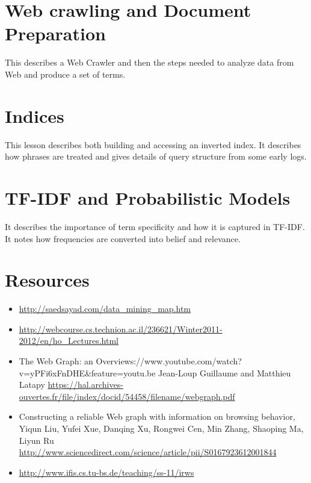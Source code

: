 \section{Web crawling and Document
Preparation}\label{web-crawling-and-document-preparation}


This describes a Web Crawler and then the steps needed to analyze data
from Web and produce a set of terms.



\section{Indices}\label{indices}


This lesson describes both building and accessing an inverted index. It
describes how phrases are treated and gives details of query structure
from some early logs.



\section{TF-IDF and Probabilistic
Models}\label{tf-idf-and-probabilistic-models}


It describes the importance of term specificity and how it is captured
in TF-IDF. It notes how frequencies are converted into belief and
relevance.


\section{Resources}\label{resources}

\begin{itemize}

\item
  \url{http://saedsayad.com/data_mining_map.htm}
\item
  \url{http://webcourse.cs.technion.ac.il/236621/Winter2011-2012/en/ho_Lectures.html}
\item
  The Web Graph: an
  Overviews://www.youtube.com/watch?v=yPFi6xFnDHE\&feature=youtu.be
  Jean-Loup Guillaume and Matthieu Latapy
  \url{https://hal.archives-ouvertes.fr/file/index/docid/54458/filename/webgraph.pdf}
\item
  Constructing a reliable Web graph with information on browsing
  behavior, Yiqun Liu, Yufei Xue, Danqing Xu, Rongwei Cen, Min Zhang,
  Shaoping Ma, Liyun Ru
  \url{http://www.sciencedirect.com/science/article/pii/S0167923612001844}
\item
  \url{http://www.ifis.cs.tu-bs.de/teaching/ss-11/irws}
\end{itemize}

